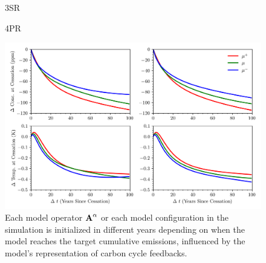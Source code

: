 \documentclass[11pt, a4paper, pdftex, twoside, dvipsnames]{article}
\newcommand{\bb}[1]{\boldsymbol{\bold{#1}}}
\begin{document}
\begin{figure}[b]
\noindent %
\begin{minipage}{0.5\textwidth}
	\noindent
	\centering
	\hspace{3em}\small{\textsc{3SR}}
\end{minipage}%
\begin{minipage}{0.5\textwidth}
	\noindent
	\centering
	\small{\textsc{4PR}}
\end{minipage}
    \includegraphics[width=\textwidth]{fig/simulate_macdougall_conc_temp.png}
    \caption{
Each model operator $\bb{A}^\alpha$  or each model configuration in the simulation is initialized in different years depending on when the model reaches the target cumulative emissions, influenced by the model's representation of carbon cycle feedbacks.
     }
    \label{fig:6}
\end{figure}
%


 
\end{document}

